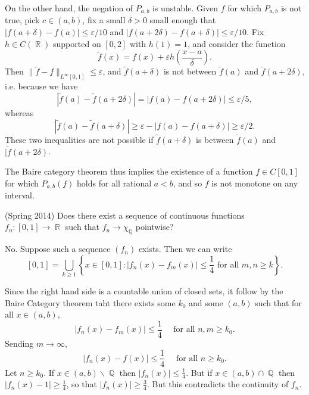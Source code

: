 \documentclass[answers]{exam}
\DeclareMathOperator{\RR}{\mathbb{R}}
\DeclareMathOperator{\QQ}{\mathbb{Q}}
\begin{document}
\begin{questions}
\begin{solution}
	On the other hand, the negation of $P_{a,b}$ is unstable. Given $f$ for which $P_{a,b}$ is not true, pick $c \in (a,b)$, fix a small $\delta > 0$ small enough that $|f(a + \delta) - f(a)| \leq \varepsilon / 10$ and $|f(a + 2\delta) - f(a + \delta)| \leq \varepsilon / 10$. Fix $h \in C(\RR)$ supported on $[0,2]$ with $h(1) = 1$, and consider the function
	\[ \tilde{f}(x) = f(x) + \varepsilon h \left( \frac{x - a}{\delta} \right). \] 
	Then $\| \tilde{f} - f \|_{L^\infty[0,1]} \leq \varepsilon$, and $\tilde{f}(a + \delta)$ is not between $\tilde{f}(a)$ and $\tilde{f}(a + 2\delta)$, i.e. because we have
	\[ |\tilde{f}(a) - \tilde{f}(a + 2 \delta)| = |f(a) - f(a + 2\delta)| \leq \varepsilon / 5, \]
	whereas
	\[ |\tilde{f}(a) - \tilde{f}(a + \delta)| \geq \varepsilon - |f(a) - f(a + \delta)| \geq \varepsilon / 2. \]
	These two inequalities are not possible if $\tilde{f}(a + \delta)$ is between $\tilde{f}(a)$ and $|\tilde{f}(a + 2 \delta)$.

	The Baire category theorem thus implies the existence of a function $f \in C[0,1]$ for which $P_{a,b}(f)$ holds for all rational $a < b$, and so $f$ is not monotone on any interval.
\end{solution}

\item (Spring 2014)
  Does there exist a sequence of continuous functions $f_n:[0,1]\to \RR$ such that $f_{n}\to \chi_{\QQ}$ pointwise?

\begin{solution}
  No. Suppose such a sequence $(f_{n})$ exists. Then we can write
  \begin{equation*}
    \left[ 0,1 \right] = \bigcup_{k\geq 1} \left\{ x\in [0,1]: \left| f_{n}(x)-f_{m}(x) \right| \leq \frac{1}{4} \text{ for all }m,n\geq k\right\}.
  \end{equation*}

  Since the right hand side is a countable union of closed sets, it follow by the Baire Category theorem taht there exists some $k_{0}$ and some $(a,b)$ such that for all $x\in (a,b)$,
  \begin{equation*}
    |f_{n}(x)-f_{m}(x)| \leq \frac{1}{4}\quad\text{ for all }n,m\geq k_{0}.
  \end{equation*}
  Sending $m\to \infty$,
  \begin{equation*}
    |f_{n}(x)-f(x)| \leq \frac{1}{4}\quad\text{ for all }n\geq k_{0}.
  \end{equation*}
  Let $n\geq k_{0}$. If $x\in (a,b)\backslash \QQ$ then $|f_{n}(x)|\leq \frac{1}{4}$. But if $x\in (a,b)\cap \QQ$ then $|f_{n}(x)-1|\geq \frac{1}{4}$, so that $|f_{n}(x)|\geq \frac{3}{4}$. But this contradicts the continuity of $f_{n}$.
\end{solution}



\end{questions}
\end{document}
